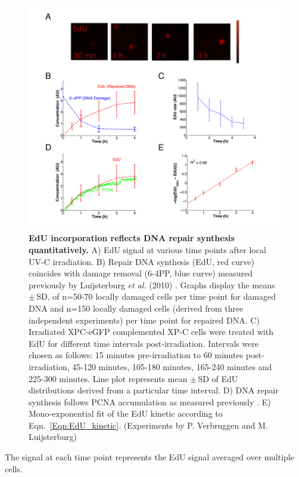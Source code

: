  \begin{figure}[t!]
\begin{center}
\includegraphics[width=1\textwidth]{Abbildungen/figure2_4.pdf}
\caption{\textbf{EdU incorporation reflects DNA repair synthesis quantitatively.} A) EdU signal at various time points after local UV-C irradiation. B) Repair DNA synthesis (EdU, red curve) coincides with damage removal (6-4PP, blue curve) measured previously by Luijsterburg \textit{et al.} (2010) \cite{Luijsterburg2010}. Graphs display the means $\pm$\,SD, of n=50-70 locally damaged cells per time point for damaged DNA and n=150 locally damaged cells (derived from three independent experiments) per time point for repaired DNA. C) Irradiated XPC-eGFP complemented XP-C cells were treated with EdU for different time intervals post-irradiation. Intervals were chosen as follows: 15 minutes pre-irradiation to 60 minutes post-irradiation, 45-120 minutes, 105-180 minutes, 165-240 minutes and 225-300 minutes. Line plot represents mean $\pm$\,SD of EdU distributions derived from a particular time interval. D) DNA repair synthesis follows PCNA accumulation as measured previously \cite{Luijsterburg2010}. E) Mono-exponential fit of the EdU kinetic according to Eqn.\ \ref{Eqn:EdU_kinetic}. (Experiments by P. Verbruggen and M. Luijsterburg)}
\label{fig:DNArepairKinetic}

\end{center}
\end{figure}
The signal at each time point represents the EdU signal averaged over multiple cells.\\
